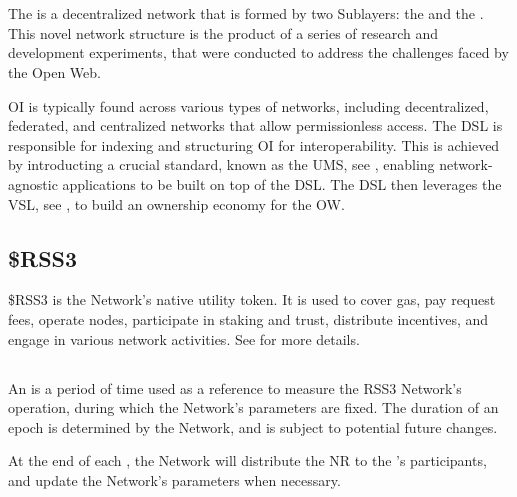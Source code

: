 \section{}

The  is a decentralized network that is formed by two Sublayers: the  and the .
This novel network structure is the product of a series of research and development experiments, that were conducted to address the challenges faced by the Open Web.

\gls{OI} is typically found across various types of networks, including decentralized, federated, and centralized networks that allow permissionless access.
The \gls{DSL} is responsible for indexing and structuring \gls{OI} for interoperability.
This is achieved by introducting a crucial standard, known as the \gls{UMS}, see , enabling network-agnostic applications to be built on top of the \gls{DSL}.
The \gls{DSL} then leverages the \gls{VSL}, see , to build an ownership economy for the \gls{OW}.

\subsection{\$RSS3}
\$RSS3 is the Network's native utility token. It is used to cover gas, pay request fees, operate nodes, participate in staking and trust, distribute incentives, and engage in various network activities. See  for more details.

\subsection{}

An  is a period of time used as a reference to measure the RSS3 Network’s operation, during which the Network's parameters are fixed.
The duration of an epoch is determined by the Network, and is subject to potential future changes.

At the end of each \epoch, the Network will distribute the \gls{NR} to the 's participants, and update the Network's parameters when necessary.